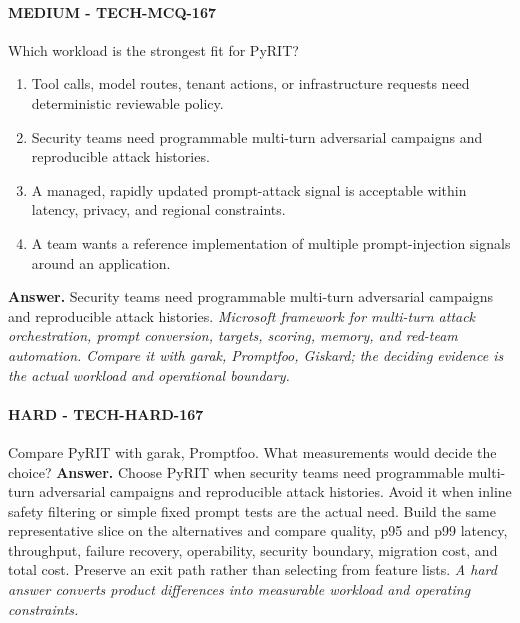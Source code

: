 \paragraph{MEDIUM - TECH-MCQ-167} Which workload is the strongest fit for PyRIT?
\begin{enumerate}[label=\Alph*.]
\item Tool calls, model routes, tenant actions, or infrastructure requests need deterministic reviewable policy.
\item Security teams need programmable multi-turn adversarial campaigns and reproducible attack histories.
\item A managed, rapidly updated prompt-attack signal is acceptable within latency, privacy, and regional constraints.
\item A team wants a reference implementation of multiple prompt-injection signals around an application.
\end{enumerate}
\textbf{Answer.} Security teams need programmable multi-turn adversarial campaigns and reproducible attack histories.
\textit{Microsoft framework for multi-turn attack orchestration, prompt conversion, targets, scoring, memory, and red-team automation. Compare it with garak, Promptfoo, Giskard; the deciding evidence is the actual workload and operational boundary.}
\paragraph{HARD - TECH-HARD-167} Compare PyRIT with garak, Promptfoo. What measurements would decide the choice?
\textbf{Answer.} Choose PyRIT when security teams need programmable multi-turn adversarial campaigns and reproducible attack histories. Avoid it when inline safety filtering or simple fixed prompt tests are the actual need. Build the same representative slice on the alternatives and compare quality, p95 and p99 latency, throughput, failure recovery, operability, security boundary, migration cost, and total cost. Preserve an exit path rather than selecting from feature lists.
\textit{A hard answer converts product differences into measurable workload and operating constraints.}
